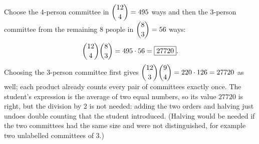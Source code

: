 Choose the $4$-person committee in $\dbinom{12}4=495$ ways and then the $3$-person committee from the remaining $8$ people in $\dbinom83=56$ ways:
\[
\dbinom{12}{4}\dbinom83=495\cdot56=\boxed{27720}.
\]
Choosing the $3$-person committee first gives $\dbinom{12}3\dbinom94=220\cdot126=27720$ as well; each product already counts every pair of committees exactly once. The student's expression is the average of two equal numbers, so its value $27720$ is right, but the division by $2$ is not needed: adding the two orders and halving just undoes double counting that the student introduced. (Halving would be needed if the two committees had the same size and were not distinguished, for example two unlabelled committees of $3$.)
